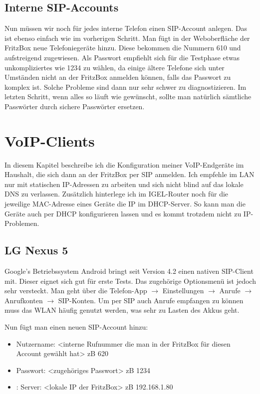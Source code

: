 \documentclass[a4paper,12pt]{scrbook}
\begin{document}
\subsection{Interne SIP-Accounts}
Nun müssen wir noch für jedes interne Telefon einen SIP-Account anlegen. Das ist ebenso einfach wie im vorherigen Schritt. Man fügt in der Weboberfläche 
der FritzBox neue Telefoniegeräte hinzu. Diese bekommen die Nummern 610 und aufstreigend zugewiesen. Als Passwort empfiehlt sich für die Testphase etwas 
unkompliziertes wie 1234 zu wählen, da einige ältere Telefone sich unter Umständen nicht an der FritzBox anmelden können, falls das Passwort zu komplex ist.
Solche Probleme sind dann nur sehr schwer zu diagnostizieren. Im letzten Schritt, wenn alles so läuft wie gewünscht, sollte man natürlich sämtliche Passwörter
durch sichere Passwörter ersetzen.


\section{VoIP-Clients}
In diesem Kapitel beschreibe ich die Konfiguration meiner VoIP-Endgeräte im Haushalt, die sich dann an der FritzBox per SIP anmelden. Ich empfehle im LAN nur mit statischen
IP-Adressen zu arbeiten und sich nicht blind auf das lokale DNS zu verlassen. Zusätzlich hinterlege ich im IGEL-Router noch für die jeweilige MAC-Adresse eines Geräte die 
IP im DHCP-Server. So kann man die Geräte auch per DHCP konfigurieren lassen und es kommt trotzdem nicht zu IP-Problemen.

\subsection{LG Nexus 5}
Google's Betriebssystem Android bringt seit Version 4.2 einen nativen SIP-Client mit. Dieser eignet sich gut für erste Tests. Das zugehörige Optionsmenü ist jedoch sehr versteckt.
Man geht über die Telefon-App $\rightarrow$ Einstellungen $\rightarrow$ Anrufe $\rightarrow$ Anrufkonten $\rightarrow$ SIP-Konten. Um per SIP auch Anrufe empfangen zu können muss
das WLAN häufig genutzt werden, was sehr zu Lasten des Akkus geht.

Nun fügt man einen neuen SIP-Account hinzu:
\begin{itemize}
 \item Nutzername: <interne Rufnummer die man in der FritzBox für diesen Account gewählt hat> zB 620
 \item Passwort: <zugehöriges Passwort> zB 1234
 \item: Server: <lokale IP der FritzBox> zB 192.168.1.80
\end{itemize}
\end{document}
